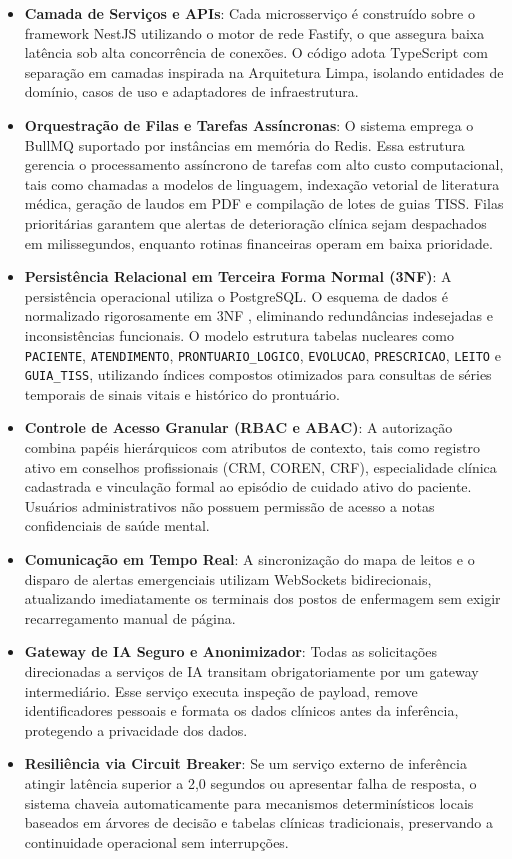 \begin{itemize}
    \item \textbf{Camada de Serviços e APIs}: Cada microsserviço é construído sobre o framework NestJS utilizando o motor de rede Fastify, o que assegura baixa latência sob alta concorrência de conexões. O código adota TypeScript com separação em camadas inspirada na Arquitetura Limpa, isolando entidades de domínio, casos de uso e adaptadores de infraestrutura.
    \item \textbf{Orquestração de Filas e Tarefas Assíncronas}: O sistema emprega o BullMQ suportado por instâncias em memória do Redis. Essa estrutura gerencia o processamento assíncrono de tarefas com alto custo computacional, tais como chamadas a modelos de linguagem, indexação vetorial de literatura médica, geração de laudos em PDF e compilação de lotes de guias TISS. Filas prioritárias garantem que alertas de deterioração clínica sejam despachados em milissegundos, enquanto rotinas financeiras operam em baixa prioridade.
    \item \textbf{Persistência Relacional em Terceira Forma Normal (3NF)}: A persistência operacional utiliza o PostgreSQL. O esquema de dados é normalizado rigorosamente em 3NF \cite{pressman:2016}, eliminando redundâncias indesejadas e inconsistências funcionais. O modelo estrutura tabelas nucleares como \texttt{PACIENTE}, \texttt{ATENDIMENTO}, \texttt{PRONTUARIO\_LOGICO}, \texttt{EVOLUCAO}, \texttt{PRESCRICAO}, \texttt{LEITO} e \texttt{GUIA\_TISS}, utilizando índices compostos otimizados para consultas de séries temporais de sinais vitais e histórico do prontuário.
    \item \textbf{Controle de Acesso Granular (RBAC e ABAC)}: A autorização combina papéis hierárquicos com atributos de contexto, tais como registro ativo em conselhos profissionais (CRM, COREN, CRF), especialidade clínica cadastrada e vinculação formal ao episódio de cuidado ativo do paciente. Usuários administrativos não possuem permissão de acesso a notas confidenciais de saúde mental.
    \item \textbf{Comunicação em Tempo Real}: A sincronização do mapa de leitos e o disparo de alertas emergenciais utilizam WebSockets bidirecionais, atualizando imediatamente os terminais dos postos de enfermagem sem exigir recarregamento manual de página.
    \item \textbf{Gateway de IA Seguro e Anonimizador}: Todas as solicitações direcionadas a serviços de IA transitam obrigatoriamente por um gateway intermediário. Esse serviço executa inspeção de payload, remove identificadores pessoais e formata os dados clínicos antes da inferência, protegendo a privacidade dos dados.
    \item \textbf{Resiliência via Circuit Breaker}: Se um serviço externo de inferência atingir latência superior a 2,0 segundos ou apresentar falha de resposta, o sistema chaveia automaticamente para mecanismos determinísticos locais baseados em árvores de decisão e tabelas clínicas tradicionais, preservando a continuidade operacional sem interrupções.
\end{itemize}

